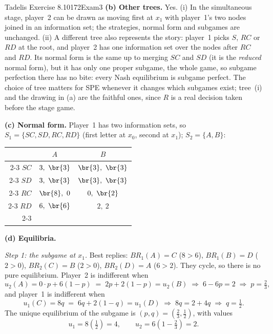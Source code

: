 \begin{exsol}{Tadelis Exercise 8.10}{172}{Exam}{3}
\textbf{(b) Other trees.} Yes. (i) In the simultaneous stage, player~2 can be drawn as moving
first at $x_1$ with player~1's two nodes joined in an information set; the strategies, normal
form and subgames are unchanged. (ii) A different tree also represents the story: player~1
picks $S$, $RC$ or $RD$ at the root, and player~2 has one information set over the nodes after
$RC$ and $RD$. Its normal form is the same up to merging $SC$ and $SD$ (it is the
\emph{reduced} normal form), but it has only one proper subgame, the whole game, so subgame
perfection there has no bite: every Nash equilibrium is subgame perfect. The choice of tree matters
for SPE whenever it changes which subgames exist; tree~(i) and the drawing in (a) are the
faithful ones, since $R$ is a real decision taken before the stage game.

\textbf{(c) Normal form.} Player~1 has two information sets, so
$S_1 = \{SC, SD, RC, RD\}$ (first letter at $x_0$, second at $x_1$); $S_2 = \{A, B\}$:
\begin{center}
\begin{tabular}{r|c|c|}
\multicolumn{1}{r}{} & \multicolumn{1}{c}{$A$} & \multicolumn{1}{c}{$B$}\\ \cline{2-3}
$SC$ & $3,\ \br{3}$ & $\br{3},\ \br{3}$ \\ \cline{2-3}
$SD$ & $3,\ \br{3}$ & $\br{3},\ \br{3}$ \\ \cline{2-3}
$RC$ & $\br{8},\ 0$ & $0,\ \br{2}$ \\ \cline{2-3}
$RD$ & $6,\ \br{6}$ & $2,\ 2$ \\ \cline{2-3}
\end{tabular}
\end{center}

\textbf{(d) Equilibria.}

\emph{Step 1: the subgame at $x_1$.} Best replies: $BR_1(A) = C$ ($8 > 6$), $BR_1(B) = D$
($2 > 0$), $BR_2(C) = B$ ($2 > 0$), $BR_2(D) = A$ ($6 > 2$). They cycle, so there is no pure
equilibrium. Player~2 is indifferent when
\begin{equation}
  u_2(A) = 0\cdot p + 6(1-p) \;=\; 2p + 2(1-p) = u_2(B)
  \;\Rightarrow\; 6 - 6p = 2 \;\Rightarrow\; p = \tfrac23 , \label{eq:tadelis-8-10-p}
\end{equation}
and player~1 is indifferent when
\begin{equation}
  u_1(C) = 8q \;=\; 6q + 2(1-q) = u_1(D)
  \;\Rightarrow\; 8q = 2 + 4q \;\Rightarrow\; q = \tfrac12 . \label{eq:tadelis-8-10-q}
\end{equation}
The unique equilibrium of the subgame is $(p,q) = (\frac23, \frac12)$, with values
\[
  u_1 = 8\left(\tfrac12\right) = 4, \qquad u_2 = 6\left(1 - \tfrac23\right) = 2 .
\]


\end{exsol}
